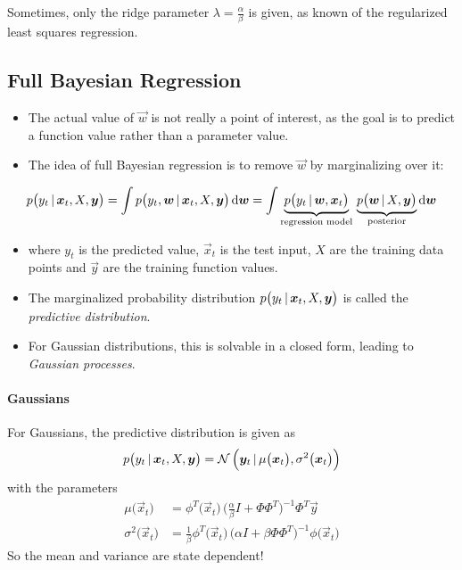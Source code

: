 			Sometimes, only the ridge parameter \(\lambda = \frac{\alpha}{\beta}\) is given, as known of the regularized least squares regression.

		\subsection{Full Bayesian Regression}
			\begin{itemize}
				\item The actual value of \(\vec{w}\) is not really a point of interest, as the goal is to predict a function value rather than a parameter value.
				\item The idea of full Bayesian regression is to remove \(\vec{w}\) by marginalizing over it:
			\end{itemize}
			\begin{equation}
				p\big(y_t \,\vert\, \bm{x}_t, X, \bm{y}\big) = \int p\big(y_t, \bm{w} \,\vert\, \bm{x}_t, X, \bm{y}\big) \dd{\bm{w}} = \int \underbrace{p\big(y_t \,\vert\, \bm{w}, \bm{x}_t\big)}_\textrm{regression model} \, \underbrace{p\big(\bm{w} \,\vert\, X, \bm{y}\big)}_\textrm{posterior} \dd{\bm{w}}
			\end{equation}
			\begin{itemize}
				\item[] where \( y_t \) is the predicted value, \( \vec{x}_t \) is the test input, \(X\) are the training data points and \(\vec{y}\) are the training function values.
				\item The marginalized probability distribution \( p\big(y_t \,\vert\, \bm{x}_t, X, \bm{y}\big) \) is called the \emph{predictive distribution}.
				\item For Gaussian distributions, this is solvable in a closed form, leading to \emph{Gaussian processes}.
			\end{itemize}

			\paragraph{Gaussians}
				For Gaussians, the predictive distribution is given as
				\begin{equation}
					p\big(y_t \,\vert\, \bm{x}_t, X, \bm{y}\big) = \mathcal{N}\,\Big(\bm{y}_t \,\vert\, \mu\big(\bm{x}_t\big), \sigma^2\big(\bm{x}_t\big)\Big)
				\end{equation}
				with the parameters
				\begin{align}
					\mu\big(\vec{x}_t\big)      & = \phi^T\big(\vec{x}_t\big) \, \Bigg( \frac{\alpha}{\beta} I + \Phi\Phi^T \!\Bigg)^{-1} \Phi^T \vec{y}             \\
					\sigma^2\big(\vec{x}_t\big) & = \frac{1}{\beta} \phi^T\big(\vec{x}_t\big) \, \big( \alpha I + \beta\Phi\Phi^T \big)^{-1} \phi\big(\vec{x}_t\big)
				\end{align}
				So the mean and variance are state dependent!

